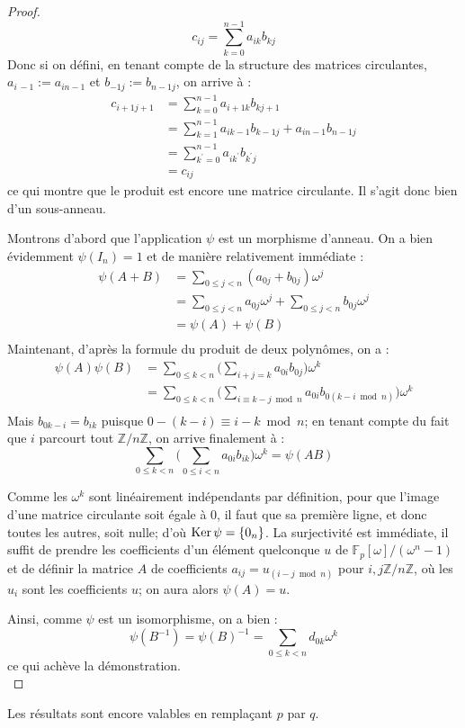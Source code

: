 \documentclass[a4paper]{article} %
\numberwithin{equation}{section}
\newcommand\zmodn[1]{\mathbb{Z}/#1\mathbb{Z}}
\newcommand\GF[1]{\mathbb{F}_{#1}}
\begin{document}
\begin{proof}
\[c_{ij} = \sum_{k=0}^{n-1}{a_{ik}b_{kj}}\]
Donc si on défini, en tenant compte de la structure des matrices circulantes, $a_{i\,-1} := a_{in-1}$ et $b_{-1j} := b_{n-1j}$, on arrive à :
\begin{align*}
c_{i+1j+1} &= \sum_{k=0}^{n-1}{a_{i+1k}b_{kj+1}}\\
&= \sum_{k=1}^{n-1}{a_{ik-1}b_{k-1j}} + a_{in-1}b_{n-1j}\\
&= \sum_{k^{\prime}=0}^{n-1}{a_{ik^{\prime}}b_{k^{\prime}j}}\\
&= c_{ij}
\end{align*}
ce qui montre que le produit est encore une matrice circulante. Il s'agit donc bien d'un sous-anneau.\par
Montrons d'abord que l'application $\psi$ est un morphisme d'anneau. On a bien évidemment $\psi(I_n) = 1$ et de manière relativement immédiate :
\begin{align*}
\psi(A + B) &= \sum_{0\leq j < n}{(a_{0j} + b_{0j})\omega^j}\\
&= \sum_{0\leq j < n}{a_{0j}\omega^j} + \sum_{0\leq j < n}{b_{0j}\omega^j}\\
&= \psi(A) + \psi(B)\\
\end{align*}
Maintenant, d'après la formule du produit de deux polynômes, on a :
\begin{align*}
\psi(A)\psi(B) &= \sum_{0\leq k < n}{\bigg(\sum_{i+j=k}{a_{0i}b_{0j}}\bigg)\omega^k}\\
&= \sum_{0\leq k < n}{\bigg(\sum_{i\equiv k-j \bmod n}{a_{0i}b_{0(k-i \bmod n)}}\bigg)\omega^k}\\
\end{align*}
Mais $b_{0k-i} = b_{ik}$ puisque $0 -(k-i) \equiv i-k \bmod n$; en tenant compte du fait que $i$ parcourt tout $\zmodn{n}$, on arrive finalement à :
\[\sum_{0\leq k < n}{\bigg(\sum_{0\leq i < n}{a_{0i}b_{ik}}\bigg)\omega^k} = \psi(AB)\]\par
Comme les $\omega^k$ sont linéairement indépendants par définition, pour que l'image d'une matrice circulante soit égale à $0$, il faut que sa première ligne, et donc toutes les autres, soit nulle; d'où $\textup{Ker}\,\psi = \{0_n\}$. La surjectivité est immédiate, il suffit de prendre les coefficients d'un élément quelconque $u$ de $\GF{p}[\omega]/(\omega^n - 1)$ et de définir la matrice $A$ de coefficients $a_{ij} = u_{(i-j \bmod n)}$ pour $i,j\zmodn{n}$, où les $u_i$ sont les coefficients $u$; on aura alors $\psi(A) = u$.\\\par
Ainsi, comme $\psi$ est un isomorphisme, on a bien :
\[\psi(B^{-1}) = \psi(B)^{-1} = \sum_{0\leq k < n}{d_{0k}\omega^k}\]
ce qui achève la démonstration.\\
\end{proof}
\begin{rem}
Les résultats sont encore valables en remplaçant $p$ par $q$.
\end{rem}
\end{document}
